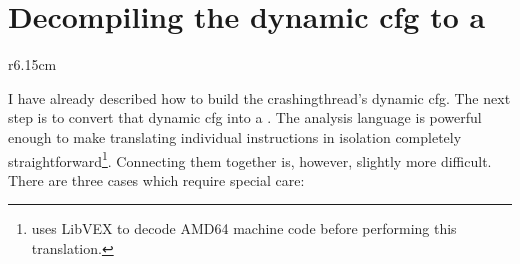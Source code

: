 \section[Decompiling the dynamic \glsentrytext{cfg} to a \StateMachine]{Decompiling the dynamic \gls{cfg} to a \StateMachine}
\label{sect:derive:compile_cfg}

\begin{wrapfigure}{r}{6.15cm}
  \begin{figgure}
  \caption{}
  \label{fig:derive:example_dissassembly1}
  \end{figgure}
\end{wrapfigure}
I have already described how to build the \gls{crashingthread}'s
dynamic \gls{cfg}.  The next step is to convert that dynamic \gls{cfg}
into a {\StateMachine}.  The {\StateMachine} analysis language is
powerful enough to make translating individual instructions in
isolation completely straightforward\footnote{{\Implementation} uses
  LibVEX  to decode AMD64 machine code before performing
  this translation.}.  Connecting them together is, however, slightly
more difficult.  There are three cases which require special care:

